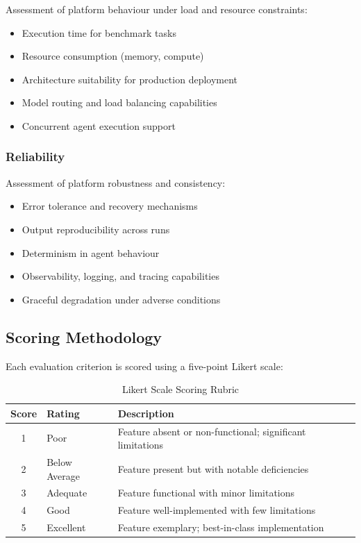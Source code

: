 \documentclass[]
{UCD_CS_FYP_Report}
\begin{document}
Assessment of platform behaviour under load and resource constraints:

\begin{itemize}
  \item Execution time for benchmark tasks
  \item Resource consumption (memory, compute)
  \item Architecture suitability for production deployment
  \item Model routing and load balancing capabilities
  \item Concurrent agent execution support
\end{itemize}

\subsubsection{Reliability}

Assessment of platform robustness and consistency:

\begin{itemize}
  \item Error tolerance and recovery mechanisms
  \item Output reproducibility across runs
  \item Determinism in agent behaviour
  \item Observability, logging, and tracing capabilities
  \item Graceful degradation under adverse conditions
\end{itemize}

\subsection{Scoring Methodology}

Each evaluation criterion is scored using a five-point Likert scale:

\begin{table}[H]
  \centering
  \begin{tabular}{|c|l|p{7cm}|}
    \hline
    \textbf{Score} & \textbf{Rating} & \textbf{Description}                                      \\
    \hline
    1              & Poor            & Feature absent or non-functional; significant limitations \\
    \hline
    2              & Below Average   & Feature present but with notable deficiencies             \\
    \hline
    3              & Adequate        & Feature functional with minor limitations                 \\
    \hline
    4              & Good            & Feature well-implemented with few limitations             \\
    \hline
    5              & Excellent       & Feature exemplary; best-in-class implementation           \\
    \hline
  \end{tabular}
  \caption{Likert Scale Scoring Rubric}
\end{table}
\end{document}
